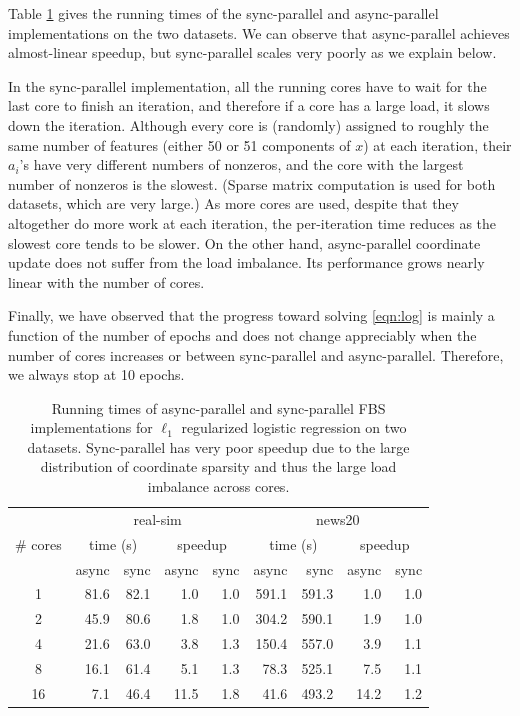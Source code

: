 Table \ref{tab:log_time} gives the running times of  the sync-parallel and async-parallel implementations on the two datasets. We can observe that async-parallel achieves almost-linear speedup, but sync-parallel scales very poorly as we explain below.

In the sync-parallel implementation,  all the running cores have to wait for the last core to finish an iteration, and therefore if a core has a large load, it slows down the iteration. Although every core is (randomly) assigned to roughly the same number of features (either 50 or 51 components of $x$) at each iteration, their  $a_i$'s have very different numbers of nonzeros, and the core with the largest number of nonzeros is the slowest. (Sparse matrix computation is used for both datasets, which are very large.) As more cores are used,  despite that they altogether do more work at each iteration,  the per-iteration time reduces as the slowest core tends to be slower. On the other hand, async-parallel coordinate update does not suffer from the  load imbalance. Its performance grows nearly linear with the number of cores.

Finally, we have observed that the progress toward solving \eqref{eqn:log} is mainly a function of the number of epochs and does not change appreciably  when the number of cores increases or between sync-parallel and async-parallel. Therefore, we always stop at 10 epochs.


\begin{table}[htbp]
\centering
 \begin{tabular}{|c|r|r|r|r|r|r|r|r|}
  \hline
  \multirow{3}{*}{\# cores} & \multicolumn{4}{|c|}{real-sim} & \multicolumn{4}{c|}{news20} \\
  \cline{2-9}
  & \multicolumn{2}{|c|}{time (s)} &  \multicolumn{2}{c|}{speedup} &  \multicolumn{2}{c|}{time (s)} & \multicolumn{2}{c|}{speedup}\\
  \cline{2-9}
  & async & sync &  async & sync &  async & sync &  async & sync \\
  \hline
   1 &   81.6 &  82.1 & 1.0   & 1.0 & 591.1   & 591.3 & 1.0   & 1.0\\
   2 &   45.9   &  80.6 & 1.8   & 1.0 & 304.2   & 590.1 & 1.9   & 1.0\\
   4 &   21.6   &  63.0   & 3.8   & 1.3 & 150.4   & 557.0 & 3.9   & 1.1\\
   8 &   16.1   &  61.4   & 5.1   & 1.3 & 78.3     & 525.1 & 7.5   & 1.1\\
   16 & 7.1     &  46.4   & 11.5 & 1.8 & 41.6     & 493.2 & 14.2 & 1.2\\
  \hline
 \end{tabular}
 \caption{\label{tab:log_time}Running times of async-parallel and sync-parallel FBS implementations for $\ell_1$ regularized logistic regression on two datasets. Sync-parallel has very poor speedup  due to the large distribution of coordinate sparsity and thus the large load imbalance across cores.}
\end{table}
